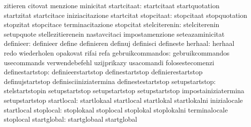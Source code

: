                                   zitieren                         citovat
                                  menzione                         minicitat
                     startcitaat: startcitaat                      startquotation
                                  startzitat                       startcitace
                                  iniziacitazione                  startcitat
                      stopcitaat: stopcitaat                       stopquotation
                                  stopzitat                        stopcitace
                                  terminacitazione                 stopcitat
                   stelciterenin: stelciterenin                    setupquote
                                  stellezitierenein                nastavcitaci
                                  impostamenzione                  seteazaminicitat
                       definieer: definieer                        define
                                  definieren                       definuj
                                  definisci                        defineste
                         herhaal: herhaal                          redo
                                  wiederholen                      opakovat
                                  rifai                            refa
                gebruikcommandos: gebruikcommandos                 usecommands
                                  verwendebefehl                   uzijprikazy
                                  usacomandi                       folosestecomenzi
                 definestartstop: definieerstartstop               definestartstop
                                  definierestartstop               definujstartstop
                                  definisciiniziatermina           definestestartstop
                  setupstartstop: stelstartstopin                  setupstartstop
                                  setupstartstop                   setupstartstop
                                  impostainiziatermina             setupstartstop
                      startlocal: startlokaal                      startlocal
                                  startlokal                       startlokalni
                                  inizialocale                     startlocal
                       stoplocal: stoplokaal                       stoplocal
                                  stoplokal                        stoplokalni
                                  terminalocale                    stoplocal
                     startglobal: startglobaal                     startglobal
